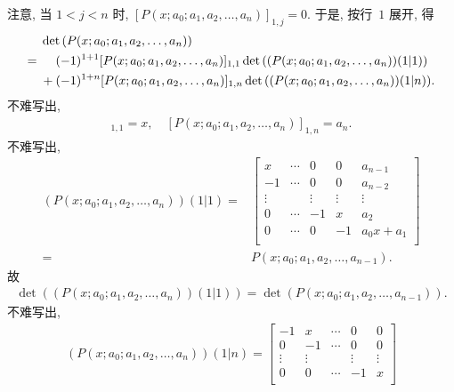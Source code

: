 \documentclass[../libro.tex]{subfiles}
\begin{document}
\begin{example}
    注意, 当 \(1 < j < n\) 时,
    \([P(x; a_0; a_1, a_2, \dots, a_n)]_{1,j} = 0\).
    于是, 按行~\(1\) 展开, 得
    \begin{align*}
        &
        \det {(P(x; a_0; a_1, a_2, \dots, a_n))}
        \\
        = {} &
        \hphantom{{} + {}}
        (-1)^{1+1} [P(x; a_0; a_1, a_2, \dots, a_n)]_{1,1}
        \det {((P(x; a_0; a_1, a_2, \dots, a_n))(1|1))}
        \\
        &
        + (-1)^{1+n} [P(x; a_0; a_1, a_2, \dots, a_n)]_{1,n}
        \det {((P(x; a_0; a_1, a_2, \dots, a_n))(1|n))}.
    \end{align*}
    不难写出,
    \begin{align*}
        [P(x; a_0; a_1, a_2, \dots, a_n)]_{1,1} = x,
        \quad
        [P(x; a_0; a_1, a_2, \dots, a_n)]_{1,n} = a_n.
    \end{align*}
    不难写出,
    \begin{align*}
        (P(x; a_0; a_1, a_2, \dots, a_n))(1|1)
        = {} &
        \begin{bmatrix}
            x      & \cdots & 0      & 0      & a_{n-1}     \\
            -1     & \cdots & 0      & 0      & a_{n-2}     \\
            \vdots & {}     & \vdots & \vdots & \vdots      \\
            0      & \cdots & -1     & x      & a_2         \\
            0      & \cdots & 0      & -1     & a_0 x + a_1 \\
        \end{bmatrix}
        \\
        = {} &
        P(x; a_0; a_1, a_2, \dots, a_{n-1}).
    \end{align*}
    故
    \begin{align*}
        \det {((P(x; a_0; a_1, a_2, \dots, a_n))(1|1))}
        = \det {(P(x; a_0; a_1, a_2, \dots, a_{n-1}))}.
    \end{align*}
    不难写出,
    \begin{align*}
        (P(x; a_0; a_1, a_2, \dots, a_n))(1|n)
        =
        \begin{bmatrix}
            -1     & x      & \cdots & 0      & 0      \\
            0      & -1     & \cdots & 0      & 0      \\
            \vdots & \vdots & {}     & \vdots & \vdots \\
            0      & 0      & \cdots & -1     & x      \\

\end{bmatrix}
\end{align*}
\end{example}
\end{document}
